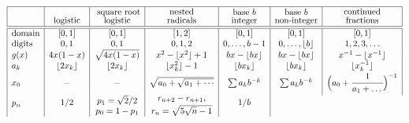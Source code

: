 \documentclass[oneside,10pt]{book}
\begin{document}
\begin{table}[H]
\[
\begin{array}{|l|c|c|c|c|c|c|}
\hline %
 &
  \shortstack{\vspace{2ex}\quad \\ logistic } & \shortstack{\vspace{-0.5ex} square root \\ logistic} &
  \shortstack{nested \\ radicals}
    & \shortstack{base $b$ \\ integer} & \shortstack{base $b$ \\ non-integer} & \shortstack{continued  \\ fractions} \\
\hline
\hline
\text{domain} & [0, 1] &  [0, 1] & [1, 2] &  [0, 1] & [0, 1] &  [0, 1] \\
\text{digits} & 0, 1 &  0, 1 & 0, 1, 2 &  0,\dots,b-1 & 0,\dots,\lfloor b\rfloor &  1,2,3,\dots \\
g(x) & 4x(1-x) & \sqrt{4x(1-x)} & x^2 -\lfloor x^2\rfloor + 1 & bx - \lfloor bx \rfloor & bx - \lfloor bx  \rfloor& x^{-1}-\lfloor x^{-1}\rfloor\\
a_k & \lfloor 2x_k\rfloor & \lfloor 2x_k\rfloor & \lfloor x_k^2 \rfloor - 1 & \lfloor bx_k\rfloor & \lfloor bx_k\rfloor & \lfloor x_k^{-1}\rfloor\\
x_0 & - & - & \sqrt{a_0+\sqrt{a_1+\cdots}} & \sum a_k b^{-k} & \sum a_k b^{-k} &
\Big(a_0 + \cfrac{1}{a_1 + \dots\,}\Big)^{-1} \\[8pt]
\shortstack{$p_n$ \\ \textcolor{white}{xx}}
 &  \shortstack{$1/2$\\ \textcolor{white}{xx}}
  &\shortstack{$p_1=\sqrt{2}/2$\\$p_0 = 1 -p_1$}
  & \shortstack{$r_{n+2}-r_{n+1},$ \\ $r_n =\sqrt{5\sqrt{n}-1}$}
  &  \shortstack{$1/b$\\ \textcolor{white}{xx}}

\end{array}\]
\end{table}
\end{document}
